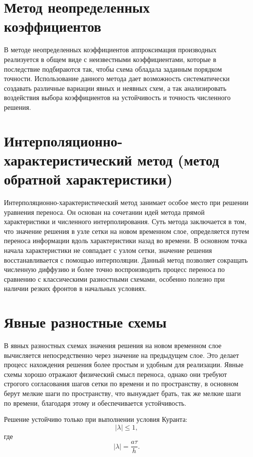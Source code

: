 \documentclass[a4paper,14pt]{extreport}
\begin{document}
\section*{Метод неопределенных коэффициентов}

В методе неопределенных коэффициентов \cite{bakhvalov, popov, hakimzyanov} аппроксимация производных реализуется в общем виде с неизвестными коэффициентами, которые в последствие подбираются так, чтобы схема обладала заданным порядком точности. Использование данного метода дает возможность систематически создавать различные вариации явных и неявных схем, а так анализировать воздействия выбора коэффициентов на устойчивость и точность численного решения.

\section*{Интерполяционно-характеристический метод (метод обратной характеристики)}

Интерполяционно-характеристический метод \cite{bakhvalov, hakimzyanov} занимает особое место при решении уравнения переноса. Он основан на сочетании идей метода прямой характеристики и численного интерполирования. Суть метода заключается в том, что значение решения в узле сетки на новом временном слое, определяется путем переноса информации вдоль характеристики назад во времени. В основном точка начала характеристики не совпадает с узлом сетки, значение решения восстанавливается с помощью интерполяции. Данный метод позволяет сокращать численную диффузию и более точно воспроизводить процесс переноса по сравнению с классическими разностными схемами, особенно полезно при наличии резких фронтов в начальных условиях.

\section*{Явные разностные схемы}

В явных разностных \cite{bakhvalov, popov, hakimzyanov} схемах значения решения на новом временном слое вычисляется непосредственно через значение на предыдущем слое. Это делает процесс нахождения решения более простым и удобным для реализации. Явные схемы хорошо отражают физический смысл переноса, однако они требуют строгого согласования шагов сетки по времени и по пространству, в основном берут мелкие шаги по пространству, что вынуждает брать, так же мелкие шаги по времени, благодаря этому и обеспечивается устойчивость.
 
Решение устойчиво только при выполнении условия Куранта:
\begin{equation}
|\lambda| \le 1,
\end{equation}
где
\begin{equation}
|\lambda| = \frac{a\tau}{h}.
\label{number:CFL}
\end{equation}
\end{document}
